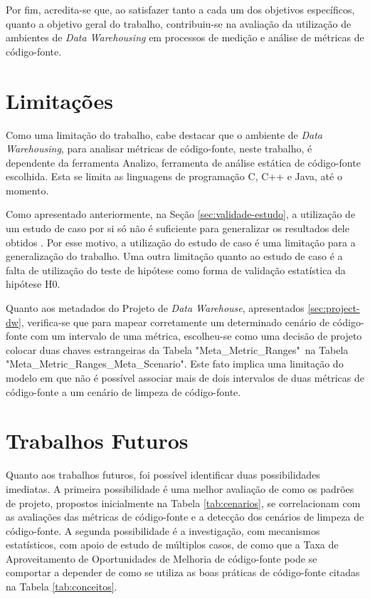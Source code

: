 Por fim, acredita-se que, ao satisfazer tanto a cada um dos objetivos específicos, quanto a objetivo geral do trabalho, contribuiu-se na avaliação da utilização de ambientes de \textit{Data Warehousing} em processos de medição e análise de métricas de código-fonte. 

\textcolor{red}{}


\section{Limitações}

Como uma limitação do trabalho, cabe destacar que o ambiente de \textit{Data Warehousing}, para analisar métricas de código-fonte, neste trabalho, é dependente da ferramenta Analizo, ferramenta de análise estática de código-fonte escolhida. Esta se limita as linguagens de programação C, C++ e Java, até o momento.

Como apresentado anteriormente, na Seção \ref{sec:validade-estudo}, a utilização de um estudo de caso por si só não é suficiente para generalizar os resultados dele obtidos \cite{yin2011applications}. Por esse motivo, a utilização do estudo de caso é uma limitação para a generalização do trabalho. Uma outra limitação quanto ao estudo de caso é a falta de utilização do teste de hipótese como forma de validação estatística da hipótese H0.

Quanto aos metadados do Projeto de \textit{Data Warehouse}, apresentados \ref{sec:project-dw}, verifica-se que para mapear corretamente um determinado cenário de código-fonte com um intervalo de uma métrica, escolheu-se como uma decisão de projeto colocar duas chaves estrangeiras da Tabela "Meta\_Metric\_Ranges"~na Tabela "Meta\_Metric\_Ranges\_Meta\_Scenario". Este fato implica uma limitação do modelo em que não é possível associar mais de dois intervalos de duas métricas de código-fonte a um cenário de limpeza de código-fonte.  

\section{Trabalhos Futuros}

Quanto aos trabalhos futuros, foi possível identificar duas possibilidades imediatas. A primeira possibilidade é uma melhor avaliação de como os padrões de projeto, propostos inicialmente na Tabela \ref{tab:cenarios}, se correlacionam com as avaliações das métricas de código-fonte e a detecção dos cenários de limpeza de código-fonte. A segunda possibilidade é a investigação, com mecanismos estatísticos, com apoio de estudo de múltiplos casos, de como que a Taxa de Aproveitamento de Oportunidades de Melhoria de código-fonte pode se comportar a depender de como se utiliza as boas práticas de código-fonte citadas na Tabela \ref{tab:conceitos}.